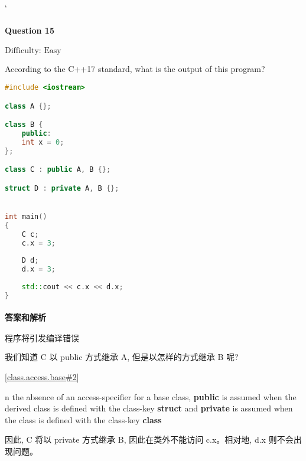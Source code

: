 `\documentclass{article}
\begin{document}
	\paragraph*{Question 15} $\boxed{\text{Difficulty: Easy}} $			
	
	According to the C++17 standard, what is the output of this program?
	
	\begin{lstlisting}[language=C++]  		
#include <iostream>

class A {};

class B {
	public:
	int x = 0;
};

class C : public A, B {};

struct D : private A, B {};


int main()
{
	C c;
	c.x = 3;
	
	D d;
	d.x = 3;
	
	std::cout << c.x << d.x;
}
	\end{lstlisting}
	
	
	\paragraph*{答案和解析} $\boxed{\text{程序将引发编译错误}} $
	
	我们知道 C 以 public 方式继承 A, 但是以怎样的方式继承 B 呢?
	
	\href{https://timsong-cpp.github.io/cppwp/n4659/class.access.base#2}{[class.access.base\#2]}
	
	\begin{lightgrayleftbar}
		n the absence of an access-specifier for a base class, \textbf{public} is assumed when the derived class is defined with the class-key \textbf{struct} and \textbf{private} is assumed when the class is defined with the class-key \textbf{class}	
	\end{lightgrayleftbar}

	因此, C 将以 private 方式继承 B, 因此在类外不能访问 c.x。相对地, d.x 则不会出现问题。
\end{document}
